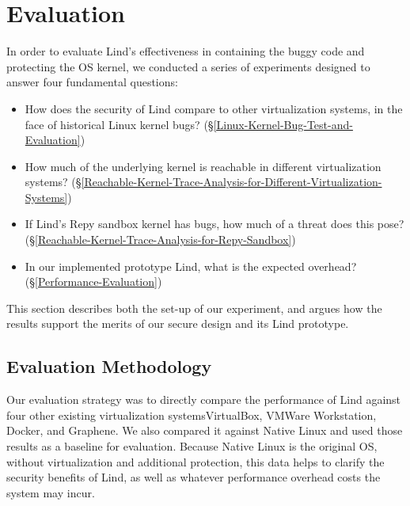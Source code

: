 \section{Evaluation}
\label{sec.evaluation}


In order to evaluate Lind's effectiveness in containing the buggy code and protecting 
the OS kernel, we conducted a series of experiments designed to answer four fundamental 
questions: 

\begin{itemize}
\item How does the security of Lind compare to other virtualization systems, 
in the face of historical Linux kernel bugs?
(\S{\ref{Linux-Kernel-Bug-Test-and-Evaluation}})

\item How much of the underlying kernel is reachable in different
virtualization systems?
(\S{\ref{Reachable-Kernel-Trace-Analysis-for-Different-Virtualization-Systems}})

\item If Lind's Repy sandbox kernel has bugs, how much of a threat does this pose?
(\S{\ref{Reachable-Kernel-Trace-Analysis-for-Repy-Sandbox}})

\item In our implemented prototype Lind, what is the expected overhead?
(\S{\ref{Performance-Evaluation}})
\end{itemize}

This section describes both the set-up of our experiment, and argues
how the results support the merits of our secure design and its Lind prototype.

\subsection{Evaluation Methodology}

Our evaluation strategy was to directly compare the performance of Lind
against
four other existing virtualization systems\textendash VirtualBox, VMWare
Workstation,
Docker, and Graphene. We also compared it against Native Linux and used
those results as a baseline for evaluation. Because Native Linux is the
original OS,
without virtualization and additional protection, this data helps to
clarify the security benefits of Lind,
as well as whatever performance overhead costs the system may incur.


